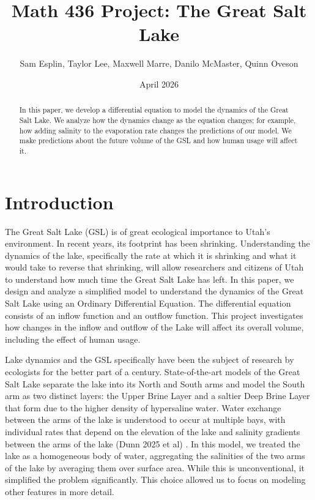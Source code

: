 \documentclass[12pt]{article}
\begin{document}
\title{Math 436 Project: The Great Salt Lake}
\author{Sam Esplin, Taylor Lee, Maxwell Marre, Danilo McMaster, Quinn Oveson}
\date{April 2026}

\maketitle

\begin{abstract}
In this paper, we develop a differential equation to model the dynamics of the Great Salt Lake. We analyze how the dynamics change as the equation changes; for example, how adding salinity to the evaporation rate changes the predictions of our model. We make predictions about the future volume of the GSL and how human usage will affect it. 
\end{abstract}

\section{Introduction}

The Great Salt Lake (GSL) is of great ecological importance to Utah's environment. In recent years, its footprint has been shrinking. Understanding the dynamics of the lake, specifically the rate at which it is shrinking and what it would take to reverse that shrinking, will allow researchers and citizens of Utah to understand how much time the Great Salt Lake has left. In this paper, we design and analyze a simplified model to understand the dynamics of the Great Salt Lake using an Ordinary Differential Equation. The differential equation consists of an inflow function and an outflow function. This project investigates how changes in the inflow and outflow of the Lake will affect its overall volume, including the effect of human usage. 

Lake dynamics and the GSL specifically have been the subject of research by ecologists for the better part of a century. State-of-the-art models of the Great Salt Lake separate the lake into its North and South arms and model the South arm as two distinct layers: the Upper Brine Layer and a saltier Deep Brine Layer that form due to the higher density of hypersaline water. Water exchange between the arms of the lake is understood to occur at multiple bays, with individual rates that depend on the elevation of the lake and salinity gradients between the arms of the lake (Dunn 2025 et al) \cite{Dunn2025}. In this model, we treated the lake as a homogeneous body of water, aggregating the salinities of the two arms of the lake by averaging them over surface area. While this is unconventional, it simplified the problem significantly. This choice allowed us to focus on modeling other features in more detail. 
\end{document}
